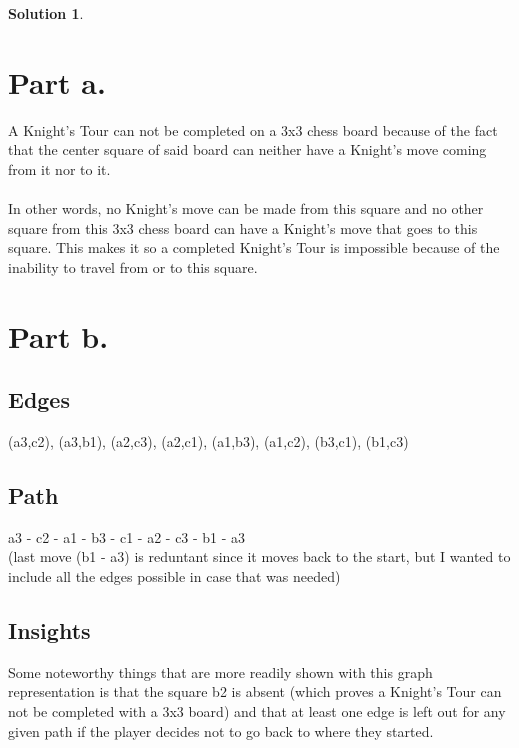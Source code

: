\documentclass{article}
\theoremstyle{definition}
\newtheorem*{solution}{Solution}
\begin{document}
\begin{solution}
\hspace{1cm}
\section*{Part a.}
A Knight's Tour can not be completed on a 3x3 chess board because of the fact that the center square of said board can neither have a Knight's move coming from it nor to it.
\\
\\
In other words, no Knight's move can be made from this square and no other square from this 3x3 chess board can have a Knight's move that goes to this square. This makes it so
a completed Knight's Tour is impossible because of the inability to travel from or to this square.

\section*{Part b.}
\subsection*{Edges}
(a3,c2), (a3,b1), (a2,c3), (a2,c1), (a1,b3), (a1,c2), (b3,c1), (b1,c3)
\subsection*{Path}
a3 - c2 - a1 - b3 - c1 - a2 - c3 - b1 - a3\\
(last move (b1 - a3) is reduntant since it moves back to the start, but I wanted to include all the edges possible in case that was needed)
\subsection*{Insights}
Some noteworthy things that are more readily shown with this graph representation is that the square b2 is absent (which proves a Knight's Tour can not be completed with a 3x3 board) and that at least one edge is left out for any given path if the player decides not to go back to where they started.
\end{solution}
\end{document}
